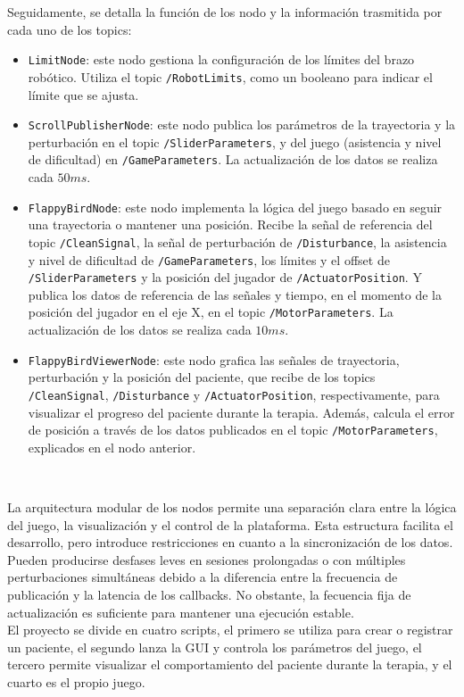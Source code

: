 Seguidamente, se detalla la función de los nodo y la información trasmitida por cada uno de los topics:
\begin{itemize}
    \item \verb|LimitNode|: este nodo gestiona la configuración de los límites del brazo robótico. Utiliza el topic \verb|/RobotLimits|, como un booleano para indicar el límite que se ajusta.
	\item \verb|ScrollPublisherNode|: este nodo publica los parámetros de la trayectoria y la perturbación en el topic \verb|/SliderParameters|, y del juego (asistencia y nivel de dificultad) en \verb|/GameParameters|. La actualización de los datos se realiza cada $50 ms$.
	\item \verb|FlappyBirdNode|: este nodo implementa la lógica del juego basado en seguir una trayectoria o mantener una posición. Recibe la señal de referencia del topic \verb|/CleanSignal|, la señal de perturbación de \verb|/Disturbance|, la asistencia y nivel de dificultad de \verb|/GameParameters|, los límites y el offset de \verb|/SliderParameters| y la posición del jugador de \verb|/ActuatorPosition|. Y publica los datos de referencia de las señales y tiempo, en el momento de la posición del jugador en el eje X, en el topic \verb|/MotorParameters|. La actualización de los datos se realiza cada $10 ms$.
	\item \verb|FlappyBirdViewerNode|: este nodo grafica las señales de trayectoria, perturbación y la posición del paciente, que recibe de los topics \verb|/CleanSignal|, \verb|/Disturbance| y \verb|/ActuatorPosition|, respectivamente, para visualizar el progreso del paciente durante la terapia. Además, calcula el error de posición a través de los datos publicados en el topic \verb|/MotorParameters|, explicados en el nodo anterior.
\end{itemize}\

La arquitectura modular de los nodos permite una separación clara entre la lógica del juego, la visualización y el control de la plataforma.
Esta estructura facilita el desarrollo, pero introduce restricciones en cuanto a la sincronización de los datos.
Pueden producirse desfases leves en sesiones prolongadas o con múltiples perturbaciones simultáneas debido a la diferencia entre la frecuencia de publicación y la latencia de los callbacks.
No obstante, la fecuencia fija de actualización es suficiente para mantener una ejecución estable.\\

El proyecto se divide en cuatro scripts, el primero se utiliza para crear o registrar un paciente, el segundo lanza la GUI y controla los parámetros del juego, el tercero permite visualizar el comportamiento del paciente durante la terapia, y el cuarto es el propio juego.

